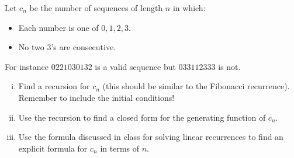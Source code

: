 \documentclass[12pt]{memoir}
\begin{document}
\begin{Ej}[Exercise 3]
   Let $c_n$ be the number of sequences of length $n$ in which:
   \begin{itemize}
    \itemsep=-0.4em
    \item Each number is one of $0,1,2,3$.
    \item No two $3$'s are consecutive.
   \end{itemize}
   For instance $0221030132$ is a valid sequence but $033112333$ is not.
   \begin{enumerate}[i)]
    \itemsep=-0.4em 
    \item Find a recursion for $c_n$ (this should be similar to the Fibonacci recurrence). Remember to include the initial conditions!
    \item Use the recursion to find a closed form for the generating function of $c_n$.
    \item Use the formula discussed in class for solving linear recurrences to find an explicit formula for $c_n$ in terms of $n$.
   \end{enumerate}
\end{Ej}
\end{document}
